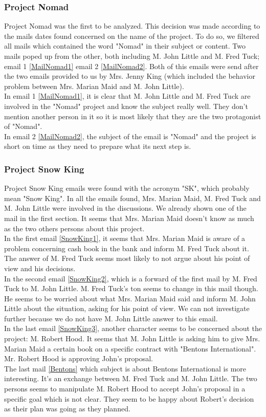 \subsubsection{Project Nomad}
Project Nomad was the first to be analyzed. This decision was made according to the mails dates found concerned on the name of the project. To do so, we filtered all mails which contained the word "Nomad" in their subject or content. Two mails poped up from the other, both including M. John Little and M. Fred Tuck; email 1 \ref{MailNomad1} email 2 \ref{MailNomad2}. Both of this emails were send after the two emails provided to us by Mrs. Jenny King (which included the behavior problem between Mrs. Marian Maid and M. John Little).\\
In email 1 \ref{MailNomad1}, it is clear that M. John Little and M. Fred Tuck are involved in the "Nomad" project and know the subject really well. They don't mention another person in it so it is most likely that they are the two protagonist of "Nomad".\\
In email 2 \ref{MailNomad2}, the subject of the email is "Nomad" and the project is short on time as they need to prepare what its next step is.

\subsubsection{Project Snow King}
Project Snow King emails were found with the acronym "SK", which probably mean "Snow King". In all the emails found, Mrs. Marian Maid, M. Fred Tuck and M. John Little were involved in the discussions. We already shown one of the mail in the first section. It seems that Mrs. Marian Maid doesn't know as much as the two others persons about this project.\\
In the first email \ref{SnowKing1}, it seems that Mrs. Marian Maid is aware of a problem concerning cash book in the bank and inform M. Fred Tuck about it. The answer of M. Fred Tuck seems most likely to not argue about his point of view and his decisions.\\
In the second email \ref{SnowKing2}, which is a forward of the first mail by M. Fred Tuck to M. John Little. M. Fred Tuck's ton seems to change in this mail though. He seems to be worried about what Mrs. Marian Maid said and inform M. John Little about the situation, asking for his point of view. We can not investigate further because we do not have M. John Little answer to this email.\\
In the last email \ref{SnowKing3}, another character seems to be concerned about the project: M. Robert Hood. It seems that M. John Little is asking him to give Mrs. Marian Maid a certain book on a specific contract with "Bentons International". Mr. Robert Hood is approving John's proposal.\\
The last mail \ref{Bentons} which subject is about Bentons International is more interesting. It's an exchange between M. Fred Tuck and M. John Little. The two persons seems to manipulate M. Robert Hood to accept John's proposal in a specific goal which is not clear. They seem to be happy about Robert's decision as their plan was going as they planned.

